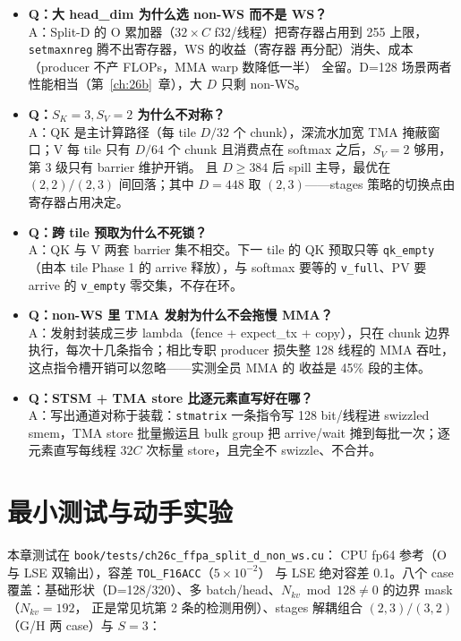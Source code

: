 \begin{itemize}[itemsep=1pt]
  \item \textbf{Q：大 head\_dim 为什么选 non-WS 而不是 WS？}\\
        A：Split-D 的 O 累加器（$32{\times}C$ f32/线程）把寄存器占用到
        255 上限，\texttt{setmaxnreg} 腾不出寄存器，WS 的收益（寄存器
        再分配）消失、成本（producer 不产 FLOPs，MMA warp 数降低一半）
        全留。D=128 场景两者性能相当（第~\ref{ch:26b}~章），大 $D$
        只剩 non-WS。
  \item \textbf{Q：$S_K{=}3,S_V{=}2$ 为什么不对称？}\\
        A：QK 是主计算路径（每 tile $D/32$ 个 chunk），深流水加宽
        TMA 掩蔽窗口；V 每 tile 只有 $D/64$ 个 chunk 且消费点在
        softmax 之后，$S_V{=}2$ 够用，第 3 级只有 barrier 维护开销。
        且 $D\ge384$ 后 spill 主导，最优在 $(2,2)/(2,3)$ 间回落；其中
        $D{=}448$ 取 $(2,3)$——stages 策略的切换点由寄存器占用决定。
  \item \textbf{Q：跨 tile 预取为什么不死锁？}\\
        A：QK 与 V 两套 barrier 集不相交。下一 tile 的 QK 预取只等
        \texttt{qk\_empty}（由本 tile Phase 1 的 arrive 释放），与
        softmax 要等的 \texttt{v\_full}、PV 要 arrive 的
        \texttt{v\_empty} 零交集，不存在环。
  \item \textbf{Q：non-WS 里 TMA 发射为什么不会拖慢 MMA？}\\
        A：发射封装成三步 lambda（fence + expect\_tx + copy），只在
        chunk 边界执行，每次十几条指令；相比专职 producer 损失整 128
        线程的 MMA 吞吐，这点指令槽开销可以忽略——实测全员 MMA 的
        收益是 45\% 段的主体。
  \item \textbf{Q：STSM + TMA store 比逐元素直写好在哪？}\\
        A：写出通道对称于装载：\texttt{stmatrix} 一条指令写
        128 bit/线程进 swizzled smem，TMA store 批量搬运且 bulk
        group 把 arrive/wait 摊到每批一次；逐元素直写每线程 $32C$
        次标量 store，且完全不 swizzle、不合并。
\end{itemize}

\section{最小测试与动手实验}\label{sec:26c-test}

本章测试在 \texttt{book/tests/ch26c\_\allowbreak{}ffpa\_\allowbreak{}split\_\allowbreak{}d\_\allowbreak{}non\_ws.cu}：
CPU fp64 参考（O 与 LSE 双输出），容差 \texttt{TOL\_F16ACC}（$5\times10^{-2}$）
与 LSE 绝对容差 0.1。八个 case 覆盖：基础形状（D=128/320）、多
batch/head、$N_{kv} \bmod 128 \ne 0$ 的边界 mask（$N_{kv}{=}192$，
正是常见坑第 2 条的检测用例）、stages 解耦组合 $(2,3)/(3,2)$
（G/H 两 case）与 $S{=}3$：

